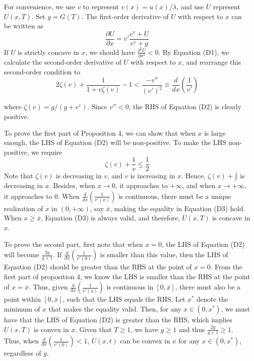 \documentclass[
  12pt,
]{article}
\begin{document}
For convenience, we use \(v\) to represent \(v(x)=u(x)/\lambda\), and
use \(U\) represent \(U(x,T)\). Set \(g= G(T)\). The first-order
derivative of \(U\) with respect to \(x\) can be written as\[\tag{D1}
\frac{\partial U}{\partial x}=v'\frac{e^v+U}{e^v+g}
\]If \(U\) is strictly concave in \(x\), we should have
\(\frac{\partial^2 U}{\partial x^2}<0\). By Equation (D1), we calculate
the second-order derivative of \(U\) with respect to \(x\), and
rearrange this second-order condition to\[\tag{D2}
2\zeta(v)+\frac{1}{1+v\zeta(v)}-1<\frac{-v''}{(v')^2}\equiv\frac{d}{dx}\left(\frac{1}{v'}\right)
\]

where \(\zeta(v)=g/(g+e^v)\). Since \(v''<0\), the RHS of Equation (D2)
is clearly positive.

To prove the first part of Proposition 4, we can show that when \(x\) is
large enough, the LHS of Equation (D2) will be non-positive. To make the
LHS non-positive, we require\[\tag{D3}
\zeta(v)+\frac{1}{v}\leq\frac{1}{2}
\]Note that \(\zeta(v)\) is decreasing in \(v\), and \(v\) is increasing
in \(x\). Hence, \(\zeta(v)+\frac{1}{v}\) is decreasing in \(x\).
Besides, when \(x\rightarrow0\), it approaches to \(+\infty\), and when
\(x\rightarrow +\infty\), it approaches to 0. When
\(\frac{d}{dx}\left(\frac{1}{v'(x)}\right)\) is continuous, there must
be a unique realization of \(x\) in \((0,+\infty)\), say \(\bar{x}\),
making the equality in Equation (D3) hold. When \(x\geq\bar{x}\),
Equation (D3) is always valid, and therefore, \(U(x,T)\) is concave in
\(x\).

To prove the second part, first note that when \(x=0\), the LHS of
Equation (D2) will become \(\frac{2g}{g+1}\). If
\(\frac{d}{dx}\left(\frac{1}{v'(0)}\right)\) is smaller than this value,
then the LHS of Equation (D2) should be greater than the RHS at the
point of \(x=0\). From the first part of proposition 4, we know the LHS
is smaller than the RHS at the point of \(x=\bar{x}\). Thus, given
\(\frac{d}{dx}\left(\frac{1}{v'(x)}\right)\) is continuous in
\([0,\bar{x}]\), there must also be a point within \([0,\bar{x}]\), such
that the LHS equals the RHS. Let \(x^*\) denote the minimum of \(x\)
that makes the equality valid. Then, for any \(x\in(0,x^*)\), we must
have that the LHS of Equation (D2) is greater than the RHS, which
implies \(U(x,T)\) is convex in \(x\). Given that \(T\geq1\), we have
\(g\geq1\) and thus \(\frac{2g}{g+1}\geq 1\). Thus, when
\(\frac{d}{dx}\left(\frac{1}{v'(0)}\right)<1\), \(U(x,t)\) can be convex
in \(x\) for any \(x\in(0,x^{*})\), regardless of \(g\).
\end{document}
